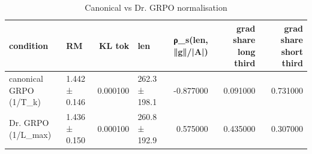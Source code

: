 \begin{table}
\caption{Canonical vs Dr. GRPO normalisation}
\label{tab:t3_normalization}
\begin{tabular}{llrlrrr}
\toprule
condition & RM & KL tok & len & ρ\_s(len, ‖g‖/|A|) & grad share long third & grad share short third \\
\midrule
canonical GRPO (1/T\_k) & 1.442 ± 0.146 & 0.000100 & 262.3 ± 198.1 & -0.877000 & 0.091000 & 0.731000 \\
Dr. GRPO (1/L\_max) & 1.436 ± 0.150 & 0.000100 & 260.8 ± 192.9 & 0.575000 & 0.435000 & 0.307000 \\
\bottomrule
\end{tabular}
\end{table}

